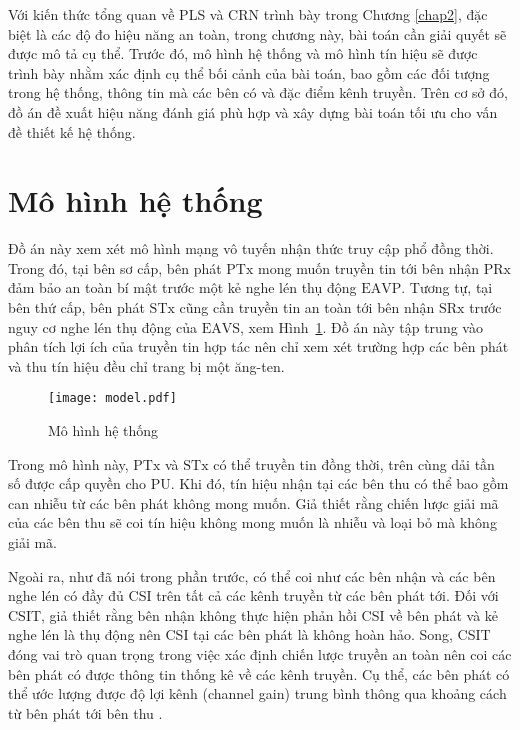 \documentclass[../main.tex]{subfiles}
\begin{document}
\label{chap3}

Với kiến thức tổng quan về PLS và CRN trình bày trong Chương \ref{chap2}, đặc biệt là các độ đo hiệu năng an toàn, trong chương này, bài toán cần giải quyết sẽ được mô tả cụ thể. Trước đó, mô hình hệ thống và mô hình tín hiệu sẽ được trình bày nhằm xác định cụ thể bối cảnh của bài toán, bao gồm các đối tượng trong hệ thống, thông tin mà các bên có và đặc điểm kênh truyền. Trên cơ sở đó, đồ án đề xuất hiệu năng đánh giá phù hợp và xây dựng bài toán tối ưu cho vấn đề thiết kế hệ thống.

\section{Mô hình hệ thống}

Đồ án này xem xét mô hình mạng vô tuyến nhận thức truy cập phổ đồng thời. Trong đó, tại bên sơ cấp, bên phát $\text{PTx}$ mong muốn truyền tin tới bên nhận $\text{PRx}$ đảm bảo an toàn bí mật trước một kẻ nghe lén thụ động $\text{EAVP}$. Tương tự, tại bên thứ cấp, bên phát $\text{STx}$ cũng cần truyền tin an toàn tới bên nhận $\text{SRx}$ trước nguy cơ nghe lén thụ động của $\text{EAVS}$, xem Hình~\ref{fig:SystemModel}. Đồ án này tập trung vào phân tích lợi ích của truyền tin hợp tác nên chỉ xem xét trường hợp các bên phát và thu tín hiệu đều chỉ trang bị một ăng-ten.

\begin{figure}
\centering
\texttt{[image: model.pdf]}
\caption{Mô hình hệ thống}
\label{fig:SystemModel}
\end{figure}

Trong mô hình này, $\text{PTx}$ và $\text{STx}$ có thể truyền tin đồng thời, trên cùng dải tần số được cấp quyền cho PU. Khi đó, tín hiệu nhận tại các bên thu có thể bao gồm can nhiễu từ các bên phát không mong muốn. Giả thiết rằng chiến lược giải mã của các bên thu sẽ coi tín hiệu không mong muốn là nhiễu và loại bỏ mà không giải mã.

Ngoài ra, như đã nói trong phần trước, có thể coi như các bên nhận và các bên nghe lén có đầy đủ CSI trên tất cả các kênh truyền từ các bên phát tới. Đối với CSIT, giả thiết rằng bên nhận không thực hiện phản hồi CSI về bên phát và kẻ nghe lén là thụ động nên CSI tại các bên phát là không hoàn hảo. Song, CSIT đóng vai trò quan trọng trong việc xác định chiến lược truyền an toàn nên coi các bên phát có được thông tin thống kê về các kênh truyền. Cụ thể, các bên phát có thể ước lượng được độ lợi kênh (channel gain) trung bình thông qua khoảng cách từ bên phát tới bên thu \cite{zou2010adaptive}.
\end{document}
